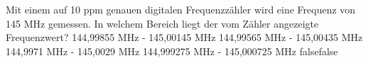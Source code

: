     {Mit einem auf 10 ppm genauen digitalen Frequenzzähler wird eine Frequenz von 145 MHz gemessen. In welchem Bereich liegt der vom Zähler angezeigte Frequenzwert?}
    {144,99855 MHz - 145,00145 MHz}
    {144,99565 MHz - 145,00435 MHz}
    {144,9971 MHz - 145,0029 MHz}
    {144,999275 MHz - 145,000725 MHz}
    {false}{false}